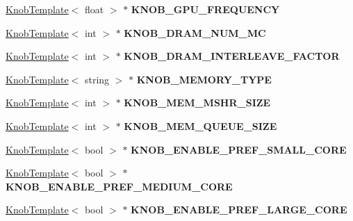\begin{DoxyCompactItemize}
\item 
\hypertarget{classall__knobs__c_a0d15c06be5414c037f9a483317c4fb35}{
\hyperlink{classKnobTemplate}{KnobTemplate}$<$ float $>$ $\ast$ {\bfseries KNOB\_\-GPU\_\-FREQUENCY}}
\label{classall__knobs__c_a0d15c06be5414c037f9a483317c4fb35}

\item 
\hypertarget{classall__knobs__c_a8865395cfcda82493dff0dcc38c0294c}{
\hyperlink{classKnobTemplate}{KnobTemplate}$<$ int $>$ $\ast$ {\bfseries KNOB\_\-DRAM\_\-NUM\_\-MC}}
\label{classall__knobs__c_a8865395cfcda82493dff0dcc38c0294c}

\item 
\hypertarget{classall__knobs__c_a990d2ba71cf626c4642310fb90dedd41}{
\hyperlink{classKnobTemplate}{KnobTemplate}$<$ int $>$ $\ast$ {\bfseries KNOB\_\-DRAM\_\-INTERLEAVE\_\-FACTOR}}
\label{classall__knobs__c_a990d2ba71cf626c4642310fb90dedd41}

\item 
\hypertarget{classall__knobs__c_a90e08d54543ca11f686b9bc315469c1d}{
\hyperlink{classKnobTemplate}{KnobTemplate}$<$ string $>$ $\ast$ {\bfseries KNOB\_\-MEMORY\_\-TYPE}}
\label{classall__knobs__c_a90e08d54543ca11f686b9bc315469c1d}

\item 
\hypertarget{classall__knobs__c_ad748259fb9b4260d2524593078aeaf5e}{
\hyperlink{classKnobTemplate}{KnobTemplate}$<$ int $>$ $\ast$ {\bfseries KNOB\_\-MEM\_\-MSHR\_\-SIZE}}
\label{classall__knobs__c_ad748259fb9b4260d2524593078aeaf5e}

\item 
\hypertarget{classall__knobs__c_a02170d3d39424f2293a18eeb5e435f3b}{
\hyperlink{classKnobTemplate}{KnobTemplate}$<$ int $>$ $\ast$ {\bfseries KNOB\_\-MEM\_\-QUEUE\_\-SIZE}}
\label{classall__knobs__c_a02170d3d39424f2293a18eeb5e435f3b}

\item 
\hypertarget{classall__knobs__c_a4d86eaf3d163d6ac55fd3c5298f60d71}{
\hyperlink{classKnobTemplate}{KnobTemplate}$<$ bool $>$ $\ast$ {\bfseries KNOB\_\-ENABLE\_\-PREF\_\-SMALL\_\-CORE}}
\label{classall__knobs__c_a4d86eaf3d163d6ac55fd3c5298f60d71}

\item 
\hypertarget{classall__knobs__c_aa7caa1ef4ddf31e95b9d47697cdd8c65}{
\hyperlink{classKnobTemplate}{KnobTemplate}$<$ bool $>$ $\ast$ {\bfseries KNOB\_\-ENABLE\_\-PREF\_\-MEDIUM\_\-CORE}}
\label{classall__knobs__c_aa7caa1ef4ddf31e95b9d47697cdd8c65}

\item 
\hypertarget{classall__knobs__c_a188af319d6c3d09bbfb46d18c8b293a5}{
\hyperlink{classKnobTemplate}{KnobTemplate}$<$ bool $>$ $\ast$ {\bfseries KNOB\_\-ENABLE\_\-PREF\_\-LARGE\_\-CORE}}
\label{classall__knobs__c_a188af319d6c3d09bbfb46d18c8b293a5}


\end{DoxyCompactItemize}
